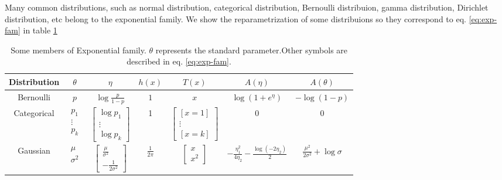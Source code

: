 Many common distributions, such as normal distribution, categorical distribution, 
Bernoulli distribuion, gamma distribution, Dirichlet distribution, etc belong to the exponential family. We show the reparametrization of some 
distribuions so they correspond to eq. \ref{eq:exp-fam} in table \ref{tab:exp-fam-reparametrization}
\begin{table}[ht]
    \centering
    \begin{tabular}{|c|c|c|c|c|c|c|}
      \hline
      Distribution & $\theta$ & $\eta$ & $h(x)$ & $T(x)$ & $A(\eta)$ & $A(\theta)$ \\
      \hline
      Bernoulli & $p$ & $\log \frac{p}{1-p}$ & $1$ & $x$ & $\log(1+e^{\eta})$ & $-\log(1-p)$\\
      \hline
      Categorical & $\begin{array}{c} p_1 \\ \vdots \\ p_k\end{array}$ & $\begin{bmatrix}\log p_1 \\ \vdots \\ \log p_k\end{bmatrix}$ & 1&  $\begin{bmatrix} [x=1] \\ \vdots \\ [x=k] \end{bmatrix}$ & 0& 0\\
      \hline
      Gaussian & $\begin{array}{c} \mu \\ \sigma^2 \end{array}$ & $\begin{bmatrix} \frac{\mu}{\sigma^2}\\ -\frac{1}{2\sigma^2} \end{bmatrix}$  & $\frac{1}{2\pi}$ & $\begin{bmatrix} x \\ x^2 \end{bmatrix} $  & $-\frac{\eta_1^2}{4\eta_2} - \frac{\log(-2\eta_2)}{2}$& $\frac{\mu^2}{2\sigma^2} + \log \sigma$\\
      \hline
    \end{tabular}
  \caption[Representatives of Exponential Family]{Some members of Exponential family. $\theta$ represents the standard parameter.Other symbols are described in eq. \ref{eq:exp-fam}.}
  \label{tab:exp-fam-reparametrization}
  \end{table}
  
